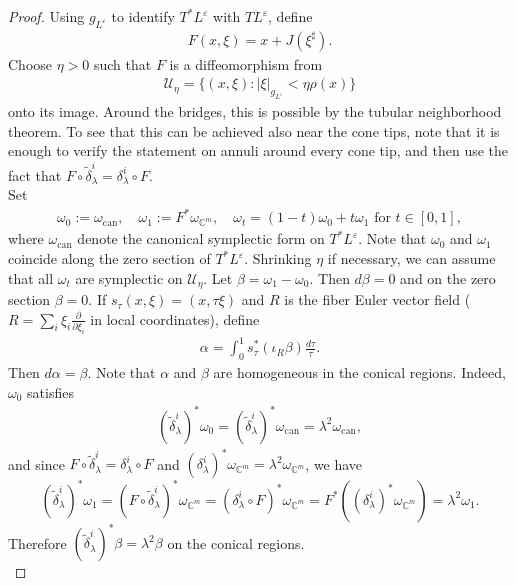 \documentclass[11pt]{amsart}
\theoremstyle{definition}
\theoremstyle{remark}
\newcommand{\C}{\mathbb{C}}
\begin{document}
\begin{proof} Using $g_{L^\varepsilon}$ to identify $T^\ast L^\varepsilon$ with $TL^\varepsilon$, define
\begin{align*}
    F(x,\xi)=x+J(\xi^\sharp).
\end{align*}
Choose $\eta>0$ such that $F$ is a diffeomorphism from 
\begin{align*}
    \mathcal{U}_\eta=\{(x,\xi):\lvert \xi\rvert_{g_{L^\varepsilon}}<\eta\rho(x)\}
\end{align*}
onto its image. Around the bridges, this is possible by the tubular neighborhood theorem. To see that this can be achieved also near the cone tips, note that it is enough to verify the statement on annuli around every cone tip, and then use the fact that $F\circ\tilde \delta^i_\lambda=\delta^i_\lambda\circ F.$\\
Set
\begin{align*}
    \omega_0:=\omega_{\mathrm{can}},\quad \omega_1:=F^\ast\omega_{\C^m},\quad \omega_t=(1-t)\omega_0+t\omega_1\text{ for }t\in [0,1],
\end{align*}
where $\omega_{\mathrm{can}}$ denote the canonical symplectic form on $T^\ast L^\varepsilon$.
Note that $\omega_0$ and $\omega_1$ coincide along the zero section of $T^\ast L^\varepsilon$. Shrinking $\eta$ if necessary, we can assume that all $\omega_t$ are symplectic on $\mathcal{U}_\eta$.
Let $\beta=\omega_1-\omega_0$. Then $d\beta=0$ and on the zero section $\beta=0$.
If $s_\tau(x,\xi)=(x,\tau\xi)$ and $R$ is the fiber Euler vector field ($R=\sum_i\xi_i\frac{\partial}{\partial \xi_i}$ in local coordinates), define
\begin{align*}
    \alpha=\int_0^1s_\tau^\ast(\iota_R\beta)\frac{d\tau}{\tau}.
\end{align*}
Then $d\alpha=\beta$. Note that $\alpha$ and $\beta$ are homogeneous in the conical regions. Indeed, $\omega_0$ satisfies
\begin{align*}
    (\widetilde\delta^i_\lambda)^\ast\omega_0=(\widetilde\delta^i_\lambda)^\ast\omega_\mathrm{can}=\lambda^2\omega_\mathrm{can},
\end{align*}
and since \(F\circ\widetilde\delta^i_\lambda
=\delta^i_\lambda\circ F\) and
\((\delta^i_\lambda)^*\omega_{\C^m}=\lambda^2\omega_{\C^m}\), we have  
\[
(\widetilde\delta^i_\lambda)^*\omega_1
=
(F\circ\widetilde\delta^i_\lambda)^*\omega_{\C^m}
=
(\delta^i_\lambda\circ F)^*\omega_{\C^m}
=
F^*((\delta^i_\lambda)^*\omega_{\C^m})
=
\lambda^2\omega_1.
\]
Therefore $(\widetilde\delta^i_\lambda)^\ast\beta=\lambda^2\beta$ on the conical regions.\\

\end{proof}
\end{document}

